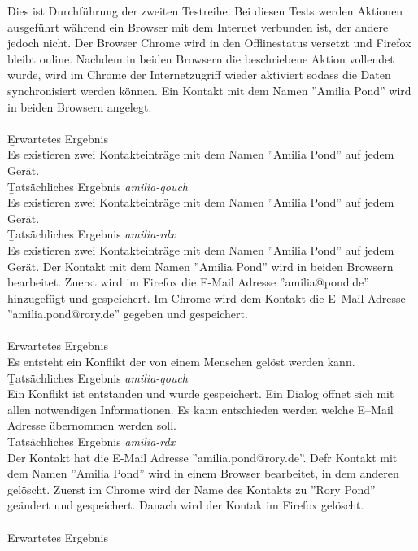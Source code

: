 Dies ist Durchführung der zweiten Testreihe.
Bei diesen Tests werden Aktionen ausgeführt während ein Browser mit dem Internet verbunden ist, der andere jedoch nicht.
Der Browser Chrome wird in den Offlinestatus versetzt und Firefox bleibt online. Nachdem in beiden Browsern die beschriebene Aktion vollendet wurde, wird im Chrome der Internetzugriff wieder aktiviert sodass die Daten synchronisiert werden können. 
% 
Ein Kontakt mit dem Namen ''Amilia Pond'' wird in beiden Browsern angelegt.\\\\
\b{Erwartetes Ergebnis}\\
Es existieren zwei Kontakteinträge mit dem Namen ''Amilia Pond'' auf jedem Gerät.\\
\b{Tatsächliches Ergebnis \it{amilia-qouch}}\\
Es existieren zwei Kontakteinträge mit dem Namen ''Amilia Pond'' auf jedem Gerät.\\
\b{Tatsächliches Ergebnis \it{amilia-rdx}}\\
Es existieren zwei Kontakteinträge mit dem Namen ''Amilia Pond'' auf jedem Gerät.
%
Der Kontakt mit dem Namen ''Amilia Pond'' wird in beiden Browsern bearbeitet.
Zuerst wird im Firefox die E-Mail Adresse ''amilia@pond.de'' hinzugefügt und gespeichert.
Im Chrome wird dem Kontakt die E--Mail Adresse ''amilia.pond@rory.de'' gegeben und gespeichert.\\\\
\b{Erwartetes Ergebnis}\\
Es entsteht ein Konflikt der von einem Menschen gelöst werden kann.\\
\b{Tatsächliches Ergebnis \it{amilia-qouch}}\\
Ein Konflikt ist entstanden und wurde gespeichert. Ein Dialog öffnet sich mit allen notwendigen Informationen.
Es kann entschieden werden welche E--Mail Adresse übernommen werden soll.\\
\b{Tatsächliches Ergebnis \it{amilia-rdx}}\\
Der Kontakt hat die E-Mail Adresse ''amilia.pond@rory.de''.
%
%
Defr Kontakt mit dem Namen ''Amilia Pond'' wird in einem Browser bearbeitet, in dem anderen gelöscht.
Zuerst im Chrome wird der Name des Kontakts zu ''Rory Pond'' geändert und gespeichert.
Danach wird der Kontak im Firefox gelöscht.\\\\
\b{Erwartetes Ergebnis}\\

